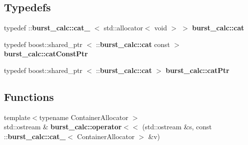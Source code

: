 \subsection*{\-Typedefs}
\begin{DoxyCompactItemize}
\item 
typedef \-::{\bf burst\-\_\-calc\-::cat\-\_\-}\*
$<$ std\-::allocator$<$ void $>$ $>$ {\bf burst\-\_\-calc\-::cat}
\item 
typedef boost\-::shared\-\_\-ptr\*
$<$ \-::{\bf burst\-\_\-calc\-::cat} const  $>$ {\bf burst\-\_\-calc\-::cat\-Const\-Ptr}
\item 
typedef boost\-::shared\-\_\-ptr\*
$<$ \-::{\bf burst\-\_\-calc\-::cat} $>$ {\bf burst\-\_\-calc\-::cat\-Ptr}
\end{DoxyCompactItemize}
\subsection*{\-Functions}
\begin{DoxyCompactItemize}
\item 
{\footnotesize template$<$typename Container\-Allocator $>$ }\\std\-::ostream \& {\bf burst\-\_\-calc\-::operator$<$$<$} (std\-::ostream \&s, const \-::{\bf burst\-\_\-calc\-::cat\-\_\-}$<$ \-Container\-Allocator $>$ \&v)
\end{DoxyCompactItemize}

